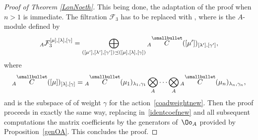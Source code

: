 \begin{proof}[Proof of Theorem \ref{LonNoeth}]
This being done, the adaptation of the proof when $n>1$ is immediate. The filtration $\mathcal{F}_3$ has to be replaced with , where  is the $A$-module defined by
\[
{}_A{\mathcal F}_3^{[\mu],[\lambda],[\gamma]}=\bigoplus_{([\mu'],[\lambda'],[\gamma'])\preceq ([\mu],[\lambda],[\gamma])} {}_A \overset{\raisebox{-1.5pt}{\scriptsize$\smallbullet$}}{C} ([\mu'])_{[\lambda'],[\gamma']},
\]
where
\[
{}_A \overset{\raisebox{-1.5pt}{\scriptsize$\smallbullet$}}{C} ([\mu])_{[\lambda],[\gamma]} ={}_A \overset{\raisebox{-1.5pt}{\scriptsize$\smallbullet$}}{C} (\mu_1)_{\lambda_1,\gamma_1}\bigotimes_A \dots \bigotimes_A {}_A \overset{\raisebox{-1.5pt}{\scriptsize$\smallbullet$}}{C} (\mu_n)_{\lambda_n,\gamma_n},
\]
 and  is the subspace of  of weight $\gamma$ for the action~\eqref{coadweightnew}. Then the proof proceeds in exactly the same way, replacing in~\eqref{identcoefnew} and all subsequent computations the matrix coefficients by the generators of~$\Oo_A$ provided by Proposition~\ref{genOA}. This concludes the proof.
\end{proof}

